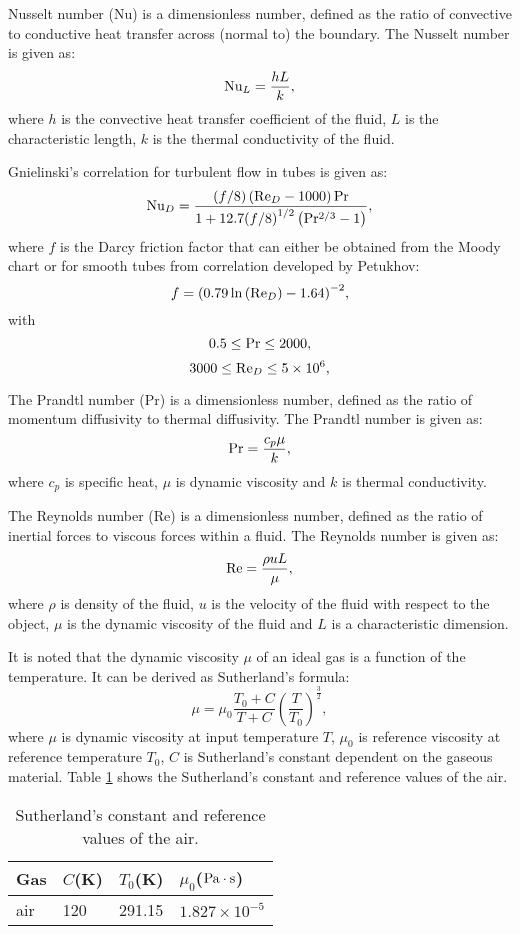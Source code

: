 \documentclass{article}
\begin{document}
Nusselt number (Nu) is a dimensionless number, defined as the ratio of convective to conductive heat transfer across (normal to) the boundary.
The Nusselt number is given as:
\[{\rm{N}}{{\rm{u}}_L} = \frac{{hL}}{k},\]
where $h$ is the convective heat transfer coefficient of the fluid, $L$ is the characteristic length, $k$ is the thermal conductivity of the fluid.

Gnielinski's correlation for turbulent flow in tubes is given as:
\[{\rm{N}}{{\rm{u}}_D} = \frac{{\left( {f/8} \right)\left( {{\rm{R}}{{\rm{e}}_D} - 1000} \right){\rm{Pr}}}}{{1 + 12.7{{(f/8)}^{1/2}}\left( {{\rm{P}}{{\rm{r}}^{2/3}} - 1} \right)}},\]
where $f$ is the Darcy friction factor that can either be obtained from the Moody chart or for smooth tubes from correlation developed by Petukhov:
\[f = {\left( {0.79\ln \left( {{\rm{R}}{{\rm{e}}_D}} \right) - 1.64} \right)^{ - 2}},\]
with
\[0.5 \le {\rm{Pr}} \le 2000,\]
\[3000 \le {\rm{R}}{{\rm{e}}_D} \le 5 \times {10^6},\]

The Prandtl number (Pr) is a dimensionless number, defined as the ratio of momentum diffusivity to thermal diffusivity.
The Prandtl number is given as:
\[{\rm{Pr}} = \frac{{{c_p}\mu }}{k},\]
where
$c_{p}$ is specific heat, $\mu$ is dynamic viscosity and $k$ is thermal conductivity.

The Reynolds number (Re) is a dimensionless number, defined as the ratio of inertial forces to viscous forces within a fluid.
The Reynolds number is given as:
\[{\rm{Re}} = \frac{{\rho uL}}{\mu },\]
where
$\rho$ is density of the fluid, $u$ is the velocity of the fluid with respect to the object, $\mu$ is the dynamic viscosity of the fluid and $L$ is a characteristic dimension.

It is noted that the dynamic viscosity $\mu$ of an ideal gas is a function of the temperature. It can be derived as Sutherland's formula:
\[\mu  = {\mu _0}\frac{{{T_0} + C}}{{T + C}}{\left( {\frac{T}{{{T_0}}}} \right)^{\frac{3}{2}}},\]
where $\mu$ is dynamic viscosity at input temperature $T$,
$\mu_0$ is reference viscosity at reference temperature $T_0$,
$C$ is Sutherland's constant dependent on the gaseous material.
Table \ref{tab:SutherlandConstant} shows the Sutherland's constant and reference values of the air.
\begin{table}[htbp]
  \centering
  \caption{Sutherland's constant and reference values of the air.}
    \begin{tabular}{p{2cm}p{2cm}p{2cm}p{3cm}}
    \toprule
    Gas   & $C$(K) & $T_0$(K) & $\mu_0$($\rm{Pa\cdot s}$) \\
    \midrule
    air   & 120   & 291.15 & $1.827\times 10^{-5}$ \\
    \bottomrule
    \end{tabular}%
  \label{tab:SutherlandConstant}%
\end{table}%
\end{document}
